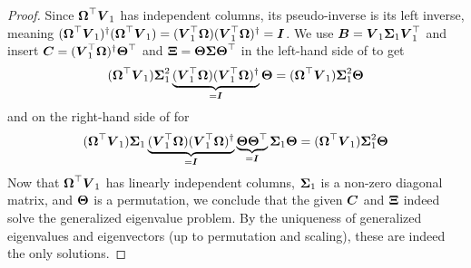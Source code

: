 \begin{proof}
    Since $\boldsymbol{\Omega}^{\top} \boldsymbol{V}_1$ has independent columns, its pseudo-inverse
    is its left inverse, meaning 
    $(\boldsymbol{\Omega}^{\top} \boldsymbol{V}_1)^{\dagger} (\boldsymbol{\Omega}^{\top} \boldsymbol{V}_1) = ( \boldsymbol{V}_1^{\top}\boldsymbol{\Omega}) ( \boldsymbol{V}_1^{\top}\boldsymbol{\Omega})^{\dagger} = \boldsymbol{I}$.
    We use $\boldsymbol{B} = \boldsymbol{V}_1 \boldsymbol{\Sigma}_1 \boldsymbol{V}_1^{\top}$ and insert
    $\boldsymbol{C} = (\boldsymbol{V}_1^{\top} \boldsymbol{\Omega})^{\dagger} \boldsymbol{\Theta}^{\top}$
    and $\boldsymbol{\Xi} = \boldsymbol{\Theta} \boldsymbol{\Sigma} \boldsymbol{\Theta}^{\top}$ in the
    left-hand side of  to get
    \begin{equation}
        (\boldsymbol{\Omega}^{\top} \boldsymbol{V}_1) \boldsymbol{\Sigma}_1^2 \underbrace{(\boldsymbol{V}_1^{\top} \boldsymbol{\Omega}) (\boldsymbol{V}_1^{\top} \boldsymbol{\Omega})^{\dagger}}_{=\boldsymbol{I}} \boldsymbol{\Theta} = (\boldsymbol{\Omega}^{\top} \boldsymbol{V}_1) \boldsymbol{\Sigma}_1^2 \boldsymbol{\Theta}
    \end{equation}
    and on the right-hand side of  for
    \begin{equation}
        (\boldsymbol{\Omega}^{\top} \boldsymbol{V}_1) \boldsymbol{\Sigma}_1 \underbrace{(\boldsymbol{V}_1^{\top} \boldsymbol{\Omega}) (\boldsymbol{V}_1^{\top} \boldsymbol{\Omega})^{\dagger}}_{=\boldsymbol{I}} \underbrace{\boldsymbol{\Theta} \boldsymbol{\Theta}^{\top}}_{=\boldsymbol{I}} \boldsymbol{\Sigma}_1 \boldsymbol{\Theta} = (\boldsymbol{\Omega}^{\top} \boldsymbol{V}_1) \boldsymbol{\Sigma}_1^2 \boldsymbol{\Theta}
    \end{equation}
    Now that $\boldsymbol{\Omega}^{\top} \boldsymbol{V}_1$ has linearly independent columns, $\boldsymbol{\Sigma}_1$ is a non-zero
    diagonal matrix, and $\boldsymbol{\Theta}$ is a permutation, we conclude that
    the given $\boldsymbol{C}$ and $\boldsymbol{\Xi}$ indeed solve the generalized eigenvalue problem.
    By the uniqueness of generalized eigenvalues and eigenvectors (up to
    permutation and scaling), these are indeed the only solutions.


\end{proof}
